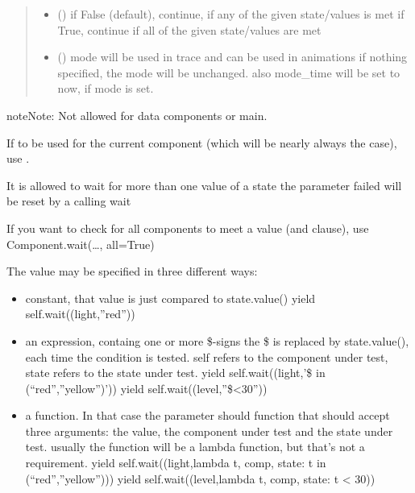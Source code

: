 \documentclass[letterpaper,10pt,english]{sphinxmanual}
\begin{document}
\begin{fulllineitems}
\begin{fulllineitems}
\begin{quote}
\begin{description}
\begin{itemize}
\item {} 
 () \textendash{} if False (default), continue, if any of the given state/values is met 
if True, continue if all of the given state/values are met

\item {} 
 () \textendash{} mode 
will be used in trace and can be used in animations 
if nothing specified, the mode will be unchanged. 
also mode\_time will be set to now, if mode is set.

\end{itemize}

\end{description}\end{quote}

\begin{sphinxadmonition}{note}{Note:}
Not allowed for data components or main.

If to be used for the current component
(which will be nearly always the case),
use .

It is allowed to wait for more than one value of a state 
the parameter failed will be reset by a calling wait

If you want to check for all components to meet a value (and clause),
use Component.wait(…, all=True)

The value may be specified in three different ways:
\begin{itemize}
\item {} 
constant, that value is just compared to state.value() 
yield self.wait((light,”red”))

\item {} 
an expression, containg one or more \$-signs
the \$ is replaced by state.value(), each time the condition is tested. 
self refers to the component under test, state refers to the state
under test. 
yield self.wait((light,’\$ in (“red”,”yellow”)’)) 
yield self.wait((level,”\$\textless{}30”)) 

\item {} 
a function. In that case the parameter should function that
should accept three arguments: the value, the component under test and the
state under test. 
usually the function will be a lambda function, but that’s not
a requirement. 
yield self.wait((light,lambda t, comp, state: t in (“red”,”yellow”))) 
yield self.wait((level,lambda t, comp, state: t \textless{} 30)) 


\end{itemize}
\end{sphinxadmonition}
\end{fulllineitems}
\end{fulllineitems}
\end{document}
